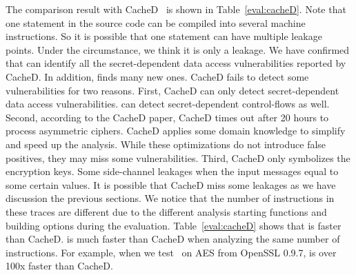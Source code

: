 The comparison result with CacheD~\cite{203878} is shown in Table~\ref{eval:cacheD}.
Note that one statement in the source code can be compiled into several machine instructions. So it is possible that one statement can have multiple leakage points. Under the circumstance, we think it is only a leakage.
We have confirmed that \detect{} can identify all the secret-dependent data access vulnerabilities reported by CacheD. In addition, \detect{} finds many new ones.
CacheD fails to detect some vulnerabilities for two
reasons. First, CacheD can only detect secret-dependent data access
vulnerabilities. \detect{} can detect secret-dependent control-flows as well.
Second, according to the CacheD paper, CacheD times out after 20 hours to process
asymmetric ciphers. CacheD applies some domain knowledge to simplify and speed up
the analysis.
While these optimizations do not introduce false positives, they may miss some
vulnerabilities.
Third, CacheD only symbolizes the encryption keys. Some side-channel leakages when the input messages equal to some certain values. It is possible that CacheD miss some
leakages as we have discussion the previous sections.
We notice that the number of instructions in these traces are different due to the different analysis starting functions and building options during the evaluation.
Table~\ref{eval:cacheD} shows that
\detect{} is faster than CacheD. \detect{} is much faster than CacheD when analyzing the same
number of instructions. For example, when we test~\detect{} on AES from OpenSSL
0.9.7, \detect{} is over 100x faster than CacheD.

